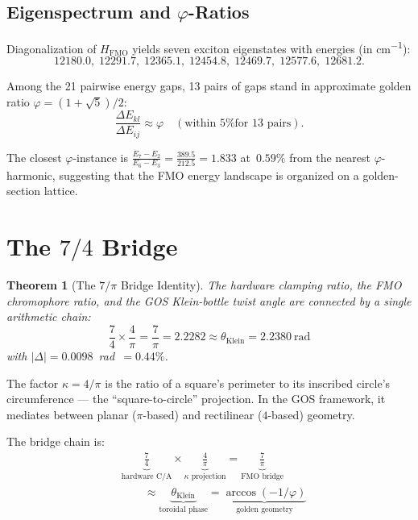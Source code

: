\documentclass[11pt,twocolumn]{article}
\newtheorem{theorem}{Theorem}
\begin{document}
\subsection{Eigenspectrum and $\varphi$-Ratios}

Diagonalization of $H_{\mathrm{FMO}}$ yields seven exciton eigenstates
with energies (in \si{cm^{-1}}\!):
\[
  12180.0,\; 12291.7,\; 12365.1,\; 12454.8,\;
  12469.7,\; 12577.6,\; 12681.2.
\]

Among the 21 pairwise energy gaps, 13 pairs of gaps stand in
approximate golden ratio $\varphi = (1+\sqrt{5})/2$:
\begin{equation}
  \frac{\Delta E_{kl}}{\Delta E_{ij}} \approx \varphi
  \quad (\text{within 5\% for 13 pairs}).
\end{equation}

The closest $\varphi$-instance is
$\frac{E_7 - E_2}{E_6 - E_3} = \frac{389.5}{212.5} = 1.833$
at~$0.59\%$ from the nearest $\varphi$-harmonic, suggesting that the
FMO energy landscape is organized on a golden-section lattice.

\section{The $7/4$ Bridge}

\begin{theorem}[The $7/\pi$ Bridge Identity]
  The hardware clamping ratio, the FMO chromophore ratio, and the GOS
  Klein-bottle twist angle are connected by a single arithmetic chain:
  \begin{equation}
    \frac{7}{4} \times \frac{4}{\pi} = \frac{7}{\pi} = 2.2282
    \approx \theta_{\mathrm{Klein}} = 2.2380~\text{rad}
  \end{equation}
  with $|\Delta| = 0.0098$~rad~$= 0.44\%$.
\end{theorem}

The factor $\kappa = 4/\pi$ is the ratio of a square's perimeter to its
inscribed circle's circumference --- the ``square-to-circle''
projection.  In the GOS framework, it mediates between planar ($\pi$-based)
and rectilinear ($4$-based) geometry.

The bridge chain is:
\begin{align*}
  &\underbrace{\frac{7}{4}}_{\text{hardware C/A}}
  \times \underbrace{\frac{4}{\pi}}_{\kappa\text{ projection}}
  = \underbrace{\frac{7}{\pi}}_{\text{FMO bridge}} \\
  &\qquad\approx \underbrace{\theta_{\mathrm{Klein}}}_{\text{toroidal phase}}
  = \underbrace{\arccos(-1/\varphi)}_{\text{golden geometry}}
\end{align*}
\end{document}
